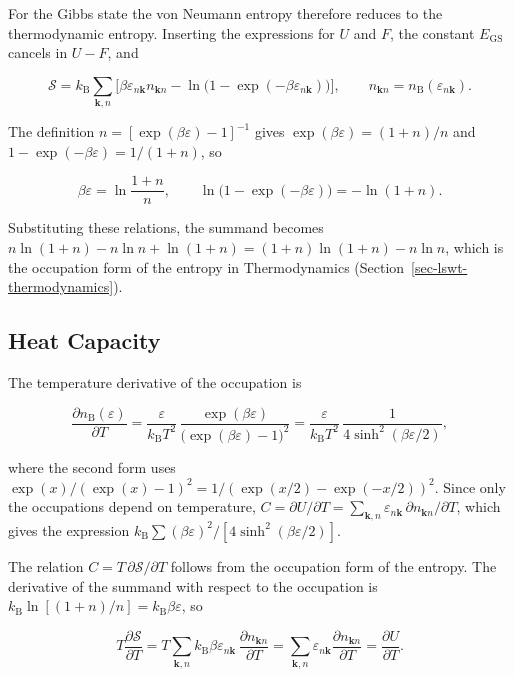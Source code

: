 For the Gibbs state the von Neumann entropy therefore reduces to the thermodynamic entropy. Inserting the expressions for \(U\) and \(F\), the constant \(E_{\mathrm{GS}}\) cancels in \(U-F\), and

\[
\mathcal S=k_{\mathrm B}\sum_{\mathbf k,n}\Big[\beta\varepsilon_{n\mathbf k}n_{\mathbf kn}-\ln\big(1-\exp(-\beta\varepsilon_{n\mathbf k})\big)\Big],
\qquad
n_{\mathbf kn}=n_{\mathrm B}(\varepsilon_{n\mathbf k}).
\]

The definition \(n=[\exp(\beta\varepsilon)-1]^{-1}\) gives \(\exp(\beta\varepsilon)=(1+n)/n\) and \(1-\exp(-\beta\varepsilon)=1/(1+n)\), so

\[
\beta\varepsilon=\ln\frac{1+n}{n},
\qquad
\ln\big(1-\exp(-\beta\varepsilon)\big)=-\ln(1+n).
\]

Substituting these relations, the summand becomes \(n\ln(1+n)-n\ln n+\ln(1+n)=(1+n)\ln(1+n)-n\ln n\), which is the occupation form of the entropy in Thermodynamics (Section~\ref{sec-lswt-thermodynamics}).

\subsection{Heat Capacity}

The temperature derivative of the occupation is

\[
\frac{\partial n_{\mathrm B}(\varepsilon)}{\partial T}
=\frac{\varepsilon}{k_{\mathrm B}T^2}\,\frac{\exp(\beta\varepsilon)}{\big(\exp(\beta\varepsilon)-1\big)^2}
=\frac{\varepsilon}{k_{\mathrm B}T^2}\,\frac{1}{4\sinh^2(\beta\varepsilon/2)},
\]

where the second form uses \(\exp(x)/(\exp(x)-1)^2=1/(\exp(x/2)-\exp(-x/2))^2\). Since only the occupations depend on temperature, \(C=\partial U/\partial T=\sum_{\mathbf k,n}\varepsilon_{n\mathbf k}\,\partial n_{\mathbf kn}/\partial T\), which gives the expression \(k_{\mathrm B}\sum(\beta\varepsilon)^2/[4\sinh^2(\beta\varepsilon/2)]\).

The relation \(C=T\,\partial\mathcal S/\partial T\) follows from the occupation form of the entropy. The derivative of the summand with respect to the occupation is \(k_{\mathrm B}\ln[(1+n)/n]=k_{\mathrm B}\beta\varepsilon\), so

\[
T\frac{\partial\mathcal S}{\partial T}
=T\sum_{\mathbf k,n}k_{\mathrm B}\beta\varepsilon_{n\mathbf k}\,\frac{\partial n_{\mathbf kn}}{\partial T}
=\sum_{\mathbf k,n}\varepsilon_{n\mathbf k}\frac{\partial n_{\mathbf kn}}{\partial T}
=\frac{\partial U}{\partial T}.
\]

